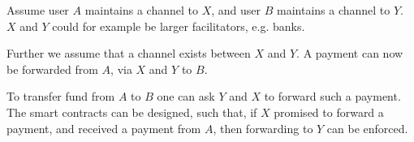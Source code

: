 \begin{example}
Assume user $A$ maintains a channel to $X$, and user $B$ maintains a channel to $Y$. $X$ and $Y$ could for example be larger facilitators, e.g. banks.

Further we assume that a channel exists between $X$ and $Y$.
%
A payment can now be forwarded from $A$, via $X$ and $Y$ to $B$.

To transfer fund from $A$ to $B$ one can ask $Y$ and $X$ to forward such a payment. The smart contracts can be designed, such that, if $X$ promised to forward a payment, and received a payment from $A$, then forwarding to $Y$ can be enforced.
\end{example}
